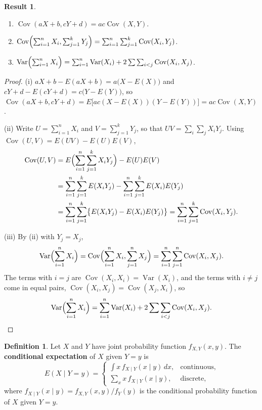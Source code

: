 \documentclass[11pt,a4paper]{article}
\theoremstyle{definition}
\newtheorem{defn}[thm]{Definition}
\newtheorem{result}[thm]{Result}
\DeclareMathOperator{\Var}{Var}
\DeclareMathOperator{\Cov}{Cov}
\begin{document}
\begin{result}\label{res:cov}
\begin{enumerate}[label=(\roman*)]
\item $\Cov(aX + b, cY + d) = ac\Cov(X, Y)$.
\item $\Cov\Bigl(\sum_{i=1}^nX_i, \sum_{j=1}^kY_j\Bigr) = \sum_{i=1}^n\sum_{j=1}^k\Cov(X_i, Y_j)$.
\item $\Var\Bigl(\sum_{i=1}^nX_i\Bigr) = \sum_{i=1}^n\Var(X_i) + 2\sum\sum_{i<j}\Cov(X_i, X_j)$.
\end{enumerate}
\end{result}

\begin{proof}
(i) $aX + b - E(aX + b) = a\bigl(X - E(X)\bigr)$ and $cY + d - E(cY + d) = c\bigl(Y - E(Y)\bigr)$, so
$\Cov(aX + b, cY + d) = E\bigl[ac(X - E(X))(Y - E(Y))\bigr] = ac\Cov(X, Y)$.

(ii) Write $U = \sum_{i=1}^nX_i$ and $V = \sum_{j=1}^kY_j$, so that $UV = \sum_i\sum_jX_iY_j$. Using $\Cov(U, V) = E(UV) - E(U)E(V)$,
\begin{align*}
\Cov(U, V) &= E\Bigl(\sum_{i=1}^n\sum_{j=1}^kX_iY_j\Bigr) - E(U)E(V) \\
&= \sum_{i=1}^n\sum_{j=1}^kE(X_iY_j) - \sum_{i=1}^n\sum_{j=1}^kE(X_i)E(Y_j) \\
&= \sum_{i=1}^n\sum_{j=1}^k\bigl\{E(X_iY_j) - E(X_i)E(Y_j)\bigr\} = \sum_{i=1}^n\sum_{j=1}^k\Cov(X_i, Y_j) .
\end{align*}

(iii) By (ii) with $Y_j = X_j$,
\[
\Var\Bigl(\sum_{i=1}^nX_i\Bigr) = \Cov\Bigl(\sum_{i=1}^nX_i, \sum_{j=1}^nX_j\Bigr) = \sum_{i=1}^n\sum_{j=1}^n\Cov(X_i, X_j) .
\]
The terms with $i = j$ are $\Cov(X_i, X_i) = \Var(X_i)$, and the terms with $i \ne j$ come in equal pairs, $\Cov(X_i, X_j) = \Cov(X_j, X_i)$, so
\[
\Var\Bigl(\sum_{i=1}^nX_i\Bigr) = \sum_{i=1}^n\Var(X_i) + 2\sum\sum_{i<j}\Cov(X_i, X_j) .
\]
\end{proof}

\begin{defn}
Let $X$ and $Y$ have joint probability function $f_{X,Y}(x, y)$. The \textbf{conditional expectation} of $X$ given $Y = y$ is
\[
E(X \mid Y = y) = \begin{cases} \displaystyle\int x\,f_{X\mid Y}(x \mid y)\,dx , & \text{continuous} , \\[2ex] \displaystyle\sum_xx\,f_{X\mid Y}(x \mid y) , & \text{discrete} , \end{cases}
\]
where $f_{X\mid Y}(x \mid y) = f_{X,Y}(x, y)/f_Y(y)$ is the conditional probability function of $X$ given $Y = y$.
\end{defn}
\end{document}
